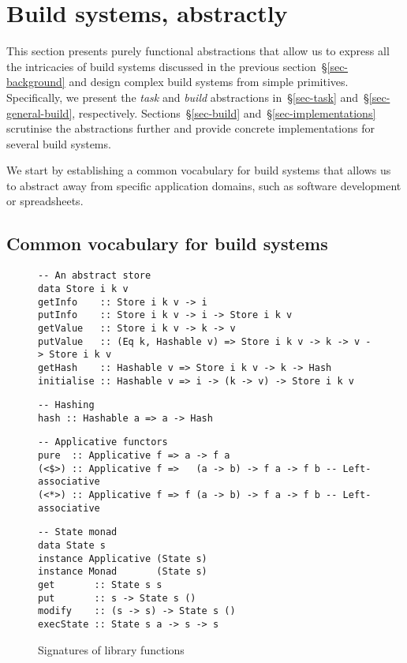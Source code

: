 \section{Build systems, abstractly}\label{sec-abstractions}

This section presents purely functional abstractions that allow us to express
all the intricacies of build systems discussed in the previous
section~\S\ref{sec-background} and design complex build systems from simple
primitives. Specifically, we present the \emph{task} and \emph{build}
abstractions in~\S\ref{sec-task} and~\S\ref{sec-general-build}, respectively.
Sections~\S\ref{sec-build} and~\S\ref{sec-implementations} scrutinise the
abstractions further and provide concrete implementations for several build
systems.

We start by establishing a common vocabulary for build systems that allows
us to abstract away from specific application domains, such as software
development or spreadsheets.

\subsection{Common vocabulary for build systems}\label{sec-vocabulary}

\begin{figure}
\begin{verbatim}
-- An abstract store
data Store i k v
getInfo    :: Store i k v -> i
putInfo    :: Store i k v -> i -> Store i k v
getValue   :: Store i k v -> k -> v
putValue   :: (Eq k, Hashable v) => Store i k v -> k -> v -> Store i k v
getHash    :: Hashable v => Store i k v -> k -> Hash
initialise :: Hashable v => i -> (k -> v) -> Store i k v
\end{verbatim}
\vspace{1mm}
\begin{verbatim}
-- Hashing
hash :: Hashable a => a -> Hash
\end{verbatim}
\vspace{1mm}
\begin{verbatim}
-- Applicative functors
pure  :: Applicative f => a -> f a
(<$>) :: Applicative f =>   (a -> b) -> f a -> f b -- Left-associative
(<*>) :: Applicative f => f (a -> b) -> f a -> f b -- Left-associative
\end{verbatim}
\vspace{1mm}
\begin{verbatim}
-- State monad
data State s
instance Applicative (State s)
instance Monad       (State s)
get       :: State s s
put       :: s -> State s ()
modify    :: (s -> s) -> State s ()
execState :: State s a -> s -> s
\end{verbatim}
\vspace{-2mm}
\caption{Signatures of library functions}\label{fig-lib-funs}
\vspace{-4mm}
\end{figure}

